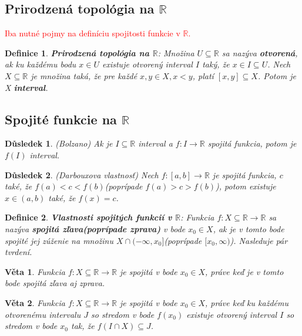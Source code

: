 \documentclass[12pt,a4paper]{article}
\newtheorem{definition}{Definice}
\newtheorem{sentence}{Věta}
\newtheorem{result}{Důsledek}
\begin{document}
\subsection{Prirodzená topológia na $\mathds{R}$}
\textcolor{red}{Iba nutné pojmy na definíciu spojitosti funkcie v $\mathds{R}$.}
\begin{definition}
	\textbf{Prirodzená topológia na $\mathds{R}$}: Množina $U\subseteq\mathds{R}$ sa nazýva \textbf{otvorená}, ak ku každému bodu $x \in U$ existuje otvorený interval $I$ taký, že $x\in I \subseteq U$. Nech $X \subseteq \mathds{R}$ je množina taká, že pre každé $x, y \in X,x<y $, platí $[x, y] \subseteq X$. Potom je X \textbf{interval}.
\end{definition}

\subsection{Spojité funkcie na $\mathds{R}$}
\begin{result}
	(Bolzano) Ak je $I\subseteq\mathds{R}$ interval a $f:I\rightarrow\mathds{R}$ spojitá funkcia, potom je $f(I)$ interval.
\end{result}

\begin{result}
	(Darbouxova vlastnosť) Nech $f:[a,b]\rightarrow\mathds{R}$ je spojitá funkcia, $c$ také, že $f(a)<c<f(b)$(poprípade $f(a)>c>f(b)$), potom existuje $x\in (a, b)$ také, že $f(x)=c$.
\end{result}

\begin{definition}
	\textbf{Vlastnosti spojitých funkcií v $\mathds{R}$}: Funkcia $f: X \subseteq \mathds{R} \rightarrow \mathds{R}$ sa nazýva \textbf{spojitá zľava(poprípade zprava)} v bode $x_{0} \in X$, ak je v tomto bode spojité jej zúženie na množinu $X \cap (-\infty, x_{0}]$(poprípade $[x_{0}, \infty)$). Nasleduje pár tvrdení.
\end{definition}

\begin{sentence}
	Funkcia $f: X \subseteq \mathds{R} \rightarrow \mathds{R}$ je spojitá v bode $x_{0} \in X$, práve keď je v tomto bode spojitá zľava aj zprava.
\end{sentence}

\begin{sentence}
	Funkcia $f: X \subseteq \mathds{R} \rightarrow \mathds{R}$ je spojitá v bode $x_{0} \in X$, práve keď ku každému otvorenému intervalu $J$ so stredom v bode $f(x_{0})$ existuje otvorený interval $I$ so stredom v bode $x_{0}$ tak, že $f(I\cap X)\subseteq J$.
\end{sentence}
\end{document}
